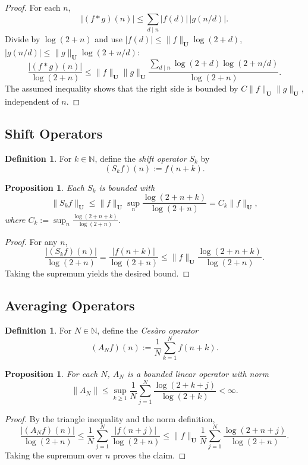 \documentclass[11pt,a4paper]{article}
\theoremstyle{plain}
\newtheorem{proposition}[theorem]{Proposition}
\theoremstyle{definition}
\newtheorem{definition}[theorem]{Definition}
\theoremstyle{remark}
\begin{document}
\begin{proof}
	For each $n$,
	\[
	|(f*g)(n)|
	\le \sum_{d\mid n}|f(d)|\,|g(n/d)|.
	\]
	Divide by $\log(2+n)$ and use
	$|f(d)| \le \|f\|_{\mathbf{U}}\log(2+d)$,
	$|g(n/d)| \le \|g\|_{\mathbf{U}}\log(2+n/d)$:
	\[
	\frac{|(f*g)(n)|}{\log(2+n)}
	\le \|f\|_{\mathbf{U}}\|g\|_{\mathbf{U}}
	\frac{\displaystyle\sum_{d\mid n}\log(2+d)\log(2+n/d)}
	{\log(2+n)}.
	\]
	The assumed inequality shows that the right side
	is bounded by $C \|f\|_{\mathbf{U}}\|g\|_{\mathbf{U}}$,
	independent of $n$.
\end{proof}

\subsection{Shift Operators}
\begin{definition}
	For $k\in\mathbb{N}$, define the
	\emph{shift operator} $S_k$ by
	\[
	(S_k f)(n) := f(n+k).
	\]
\end{definition}

\begin{proposition}
	Each $S_k$ is bounded with
	\[
	\|S_k f\|_{\mathbf{U}}
	\le \|f\|_{\mathbf{U}}
	\sup_{n}\frac{\log(2+n+k)}{\log(2+n)}
	= C_k \|f\|_{\mathbf{U}},
	\]
	where $C_k:=\sup_{n}\frac{\log(2+n+k)}{\log(2+n)}$.
\end{proposition}

\begin{proof}
	For any $n$,
	\[
	\frac{|(S_k f)(n)|}{\log(2+n)}
	= \frac{|f(n+k)|}{\log(2+n)}
	\le \|f\|_{\mathbf{U}}
	\frac{\log(2+n+k)}{\log(2+n)}.
	\]
	Taking the supremum yields the desired bound.
\end{proof}

\subsection{Averaging Operators}
\begin{definition}
	For $N\in\mathbb{N}$, define the
	\emph{Cesàro operator}
	\[
	(A_N f)(n) := \frac{1}{N}\sum_{k=1}^{N} f(n+k).
	\]
\end{definition}

\begin{proposition}
	For each $N$, $A_N$ is a bounded linear operator
	with norm
	\[
	\|A_N\| \le
	\sup_{k\ge1}\frac{1}{N}
	\sum_{j=1}^{N}
	\frac{\log(2+k+j)}{\log(2+k)}
	<\infty.
	\]
\end{proposition}

\begin{proof}
	By the triangle inequality and the norm definition,
	\[
	\frac{|(A_N f)(n)|}{\log(2+n)}
	\le \frac{1}{N}\sum_{j=1}^{N}
	\frac{|f(n+j)|}{\log(2+n)}
	\le \|f\|_{\mathbf{U}}
	\frac{1}{N}\sum_{j=1}^{N}
	\frac{\log(2+n+j)}{\log(2+n)}.
	\]
	Taking the supremum over $n$ proves the claim.
\end{proof}
\end{document}
